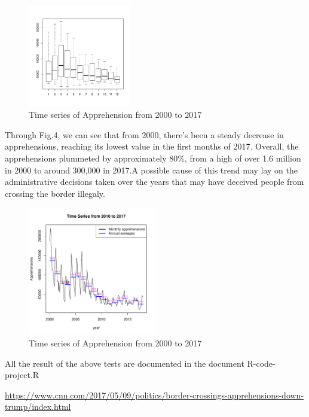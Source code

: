\documentclass[journal, a4paper]{IEEEtran}
\begin{document}
\begin{figure}[!hbt]
\begin{center}

{

\includegraphics[width=0.4\textwidth]{pdf_template3-fig4}
\caption{Time series of Apprehension from 2000 to 2017}
}

\end{center}
\end{figure} 

Through Fig.4, we can see that from 2000, there's been a steady decrease in apprehensions, reaching its lowest value in  the first months of 2017. Overall, the apprehensions plummeted by approximately 80\%, from a high of over 1.6 million in 2000 to around 300,000 in 2017.A possible cause of this trend may lay on the administrative decisions taken over the years that may have deceived people from crossing the border illegaly. 

\begin{figure}[!hbt]
\begin{center}

{

\includegraphics[width=0.5\textwidth]{pdf_template3-fig3}
\caption{Time series of Apprehension from 2000 to 2017}
}

\end{center}
\end{figure} 


	\begin{thebibliography}{5}
		
		
		
  	 All the result of the above tests are documented in the document R-code-project.R
	
     \url{https://www.cnn.com/2017/05/09/politics/border-crossings-apprehensions-down-trump/index.html}
		
	\end{thebibliography}
		
	
\end{document}
